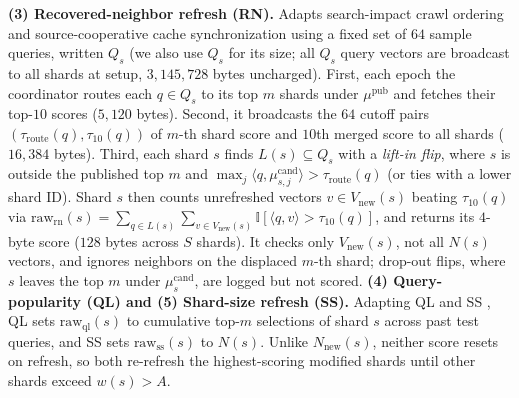 \textbf{(3) Recovered-neighbor refresh (RN).} Adapts search-impact crawl ordering \cite{pandey2008crawlorder} and source-cooperative cache synchronization \cite{olston2002besteffort} using a fixed set of $64$ sample queries, written $Q_s$ (we also use $Q_s$ for its size; all $Q_s$ query vectors are broadcast to all shards at setup, $3{,}145{,}728$ bytes uncharged). First, each epoch the coordinator routes each $q \in Q_s$ to its top $m$ shards under $\mu^{\text{pub}}$ and fetches their top-$10$ scores ($5{,}120$ bytes). Second, it broadcasts the $64$ cutoff pairs $(\tau_{\text{route}}(q), \tau_{10}(q))$ of $m$-th shard score and $10$th merged score to all shards ($16{,}384$ bytes). Third, each shard $s$ finds $L(s) \subseteq Q_s$ with a \emph{lift-in flip}, where $s$ is outside the published top $m$ and $\max_j \langle q, \mu_{s,j}^{\text{cand}} \rangle > \tau_{\text{route}}(q)$ (or ties with a lower shard ID). Shard $s$ then counts unrefreshed vectors $v \in V_{\text{new}}(s)$ beating $\tau_{10}(q)$ via $\text{raw}_{\text{rn}}(s) = \allowbreak \sum_{q \in L(s)} \sum_{v \in V_{\text{new}}(s)} \mathbb{I}[\langle q, v \rangle > \tau_{10}(q)]$, and returns its $4$-byte score ($128$ bytes across $S$ shards). It checks only $V_{\text{new}}(s)$, not all $N(s)$ vectors, and ignores neighbors on the displaced $m$-th shard; drop-out flips, where $s$ leaves the top $m$ under $\mu_s^{\text{cand}}$, are logged but not scored. \textbf{(4) Query-popularity (QL) and (5) Shard-size refresh (SS).} Adapting QL and SS \cite{shokouhi2007updating}, QL sets $\text{raw}_{\text{ql}}(s)$ to cumulative top-$m$ selections of shard $s$ across past test queries, and SS sets $\text{raw}_{\text{ss}}(s)$ to $N(s)$. Unlike $N_{\text{new}}(s)$, neither score resets on refresh, so both re-refresh the highest-scoring modified shards until other shards exceed $w(s) > A$.

